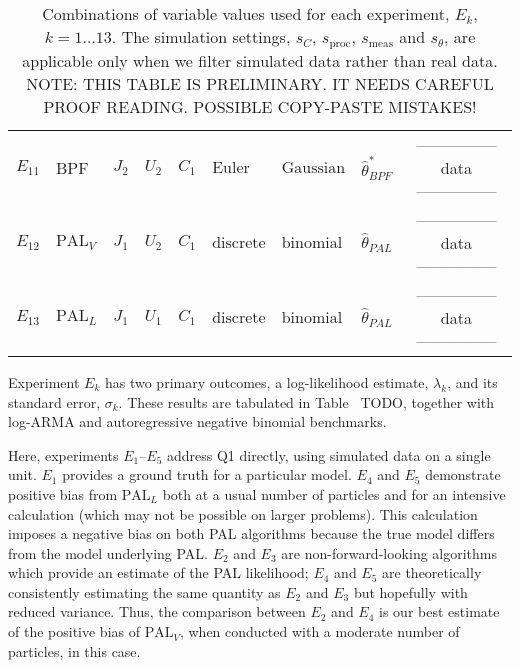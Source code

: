 \documentclass{article}
\newcommand\loglik{\lambda}
\newcommand\sproc{s_{\mathrm{proc}}}
\newcommand\smeas{s_{\mathrm{meas}}}
\newcommand\fprocDiscrete{\mathrm{discrete}}
\newcommand\fprocEuler{\mathrm{Euler}}
\newcommand\fmeasBinomial{\mathrm{binomial}}
\newcommand\fmeasGaussian{\mathrm{Gaussian}}
\newcommand\PALL{$\mathrm{PAL}_L$} %
\newcommand\PALV{$\mathrm{PAL}_V$} %
\newcommand\eic[1]{{\color{Orange} #1}}
\begin{document}
\begin{table}
\begin{tabular}{llllllllllll}
\\
$E_{11}$ &  BPF & $J_2$ & $U_2$ & 
  $C_1$ & $\fprocEuler$ & $\fmeasGaussian$ & $\hat\theta^*_{BPF}$ &
  \multicolumn{4}{c}{\hfill --------------- \hfill data \hfill --------------- \hfill}
\\
$E_{12}$ &  \PALV & $J_1$ & $U_2$ & 
  $C_1$ & $\fprocDiscrete$ & $\fmeasBinomial$ & $\hat\theta_{PAL}$ &
  \multicolumn{4}{c}{\hfill --------------- \hfill data \hfill --------------- \hfill}
\\
$E_{13}$ &  \PALL & $J_1$ & $U_1$ & 
  $C_1$ & $\fprocDiscrete$ & $\fmeasBinomial$ & $\hat\theta_{PAL}$ &
  \multicolumn{4}{c}{\hfill --------------- \hfill data \hfill --------------- \hfill}
\\
\hline
 \end{tabular}
 \caption{Combinations of variable values used for each experiment, $E_k$, $k=1\dots 13$. The simulation settings, $s_C$, $\sproc$, $\smeas$ and $s_\theta$, are applicable only when we filter simulated data rather than real data. \eic{NOTE: THIS TABLE IS PRELIMINARY. IT NEEDS CAREFUL PROOF READING. POSSIBLE COPY-PASTE MISTAKES!}
}
 \end{table}

Experiment $E_k$ has two primary outcomes, a log-likelihood estimate, $\loglik_k$, and its standard error, $\sigma_k$. 
These results are tabulated in Table~\eic{TODO}, together with log-ARMA and autoregressive negative binomial benchmarks.

Here, experiments $E_1$--$E_5$ address Q1 directly, using simulated data on a single unit. 
$E_1$ provides a ground truth for a particular model.
$E_4$ and $E_5$ demonstrate positive bias from {\PALL} both at a usual number of particles and for an intensive calculation (which may not be possible on larger problems).
This calculation imposes a negative bias on both PAL algorithms because the true model differs from the model underlying PAL. 
$E_2$ and $E_3$ are non-forward-looking algorithms which provide an estimate of the PAL likelihood; $E_4$ and $E_5$ are theoretically consistently estimating the same quantity as $E_2$ and $E_3$ but hopefully with reduced variance. 
Thus, the comparison between $E_2$ and $E_4$ is our best estimate of the positive bias of {\PALV}, when conducted with a moderate number of particles, in this case.
\end{document}
